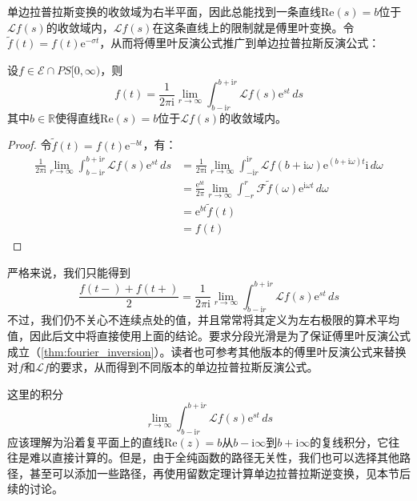 单边拉普拉斯变换的收敛域为右半平面，因此总能找到一条直线$\mathrm{Re}(s)=b$位于$\mathcal{L} f(s)$的收敛域内，$\mathcal{L} f(s)$在这条直线上的限制就是傅里叶变换。令$\tilde{f}(t)=f(t)\mathrm{e}^{-\sigma t}$，从而将傅里叶反演公式推广到单边拉普拉斯反演公式：
\begin{theorem}[单边拉普拉斯反演公式]
    \label{thm:laplace_inversion}
    设$f\in\mathcal{E}\cap PS[0,\infty) $，则
    \[f(t)=\frac{1}{2\pi \mathrm{i}}\lim_{r\to\infty}\int_{b-\mathrm{i}r}^{b +\mathrm{i}r}\mathcal{L} f(s)\mathrm{e}^{st}\,ds\]
    其中$b\in\mathbb{R}$使得直线$\mathrm{Re}(s)=b$位于$\mathcal{L} f(s)$的收敛域内。
\end{theorem}
\begin{proof}
    令$\tilde{f}(t)=f(t)\mathrm{e}^{-b t}$，有：
    \begin{align*}
        \frac{1}{2\pi \mathrm{i}}\lim_{r\to\infty}\int_{b-\mathrm{i}r}^{b +\mathrm{i}r}\mathcal{L} f(s)\mathrm{e}^{st}\,ds&=\frac{1}{2\pi \mathrm{i}}\lim_{r\to\infty}\int_{-\mathrm{i}r}^{\mathrm{i}r}\mathcal{L} f(b +\mathrm{i}\omega)\mathrm{e}^{(b +\mathrm{i}\omega)t}\mathrm{i}\,d\omega\\
        &=\frac{\mathrm{e}^{b t}}{2\pi}\lim_{r\to\infty}\int_{-r}^{r}\mathcal{F} \tilde{f}(\omega)\mathrm{e}^{\mathrm{i}\omega t}\,d\omega\\
        &=\mathrm{e}^{b t}\tilde{f}(t)\\
        &=f(t)
    \end{align*}
\end{proof}
\begin{remark}
    严格来说，我们只能得到
    \[\frac{f(t-)+f(t+)}{2}=\frac{1}{2\pi \mathrm{i}}\lim_{r\to\infty}\int_{b-\mathrm{i}r}^{b +\mathrm{i}r}\mathcal{L} f(s)\mathrm{e}^{st}\,ds\]
    不过，我们仍不关心不连续点处的值，并且常常将其定义为左右极限的算术平均值，因此后文中将直接使用上面的结论。要求分段光滑是为了保证傅里叶反演公式成立（\cref{thm:fourier_inversion}）。读者也可参考其他版本的傅里叶反演公式来替换对$f$和$\mathcal{L} f$的要求，从而得到不同版本的单边拉普拉斯反演公式。
\end{remark}
\begin{remark}
    这里的积分\[\lim_{r\to\infty}\int_{b-\mathrm{i}r}^{b +\mathrm{i}r}\mathcal{L} f(s)\mathrm{e}^{st}\,ds\]
    应该理解为沿着复平面上的直线$\mathrm{Re}(z)=b$从$b-\mathrm{i}\infty$到$b+\mathrm{i}\infty$的复线积分，它往往是难以直接计算的。但是，由于全纯函数的路径无关性，我们也可以选择其他路径，甚至可以添加一些路径，再使用留数定理计算单边拉普拉斯逆变换，见本节后续的讨论。
\end{remark}

